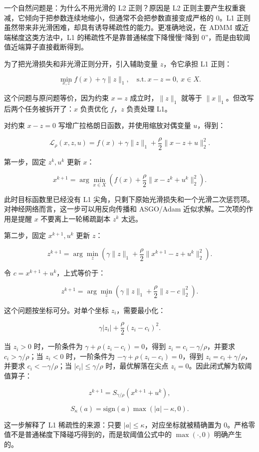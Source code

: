 \documentclass[UTF8,a4paper,12pt,fontset=none]{ctexart}
\begin{document}
一个自然问题是：为什么不用光滑的 L2 正则？原因是 L2 正则主要产生权重衰减，它倾向于把参数连续地缩小，但通常不会把参数直接变成严格的 0。L1 正则虽然带来非光滑困难，却具有诱导稀疏性的能力。更准确地说，在 ADMM 或近端梯度这类方法中，L1 的稀疏性不是靠普通梯度下降慢慢“降到 0”，而是由软阈值近端算子直接截断得到。

为了把光滑损失和非光滑正则分开，引入辅助变量 $z$，令它承担 L1 正则：

\[
\min_{x,z} f(x)+\gamma\|z\|_1,\quad \mathrm{s.t.}\ x-z=0,\ x\in X.
\]

这个问题与原问题等价，因为约束 $x=z$ 成立时，$\|z\|_1$ 就等于 $\|x\|_1$。但改写后两个任务被拆开了：$x$ 负责优化 $f$，$z$ 负责处理 L1。

对约束 $x-z=0$ 写增广拉格朗日函数，并使用缩放对偶变量 $u$，得到：

\[
\mathcal L_\rho(x,z,u)=f(x)+\gamma\|z\|_1+\frac{\rho}{2}\|x-z+u\|_2^2.
\]

第一步，固定 $z^k,u^k$ 更新 $x$：

\[
x^{k+1}=\arg\min_{x\in X}\left(f(x)+\frac{\rho}{2}\|x-z^k+u^k\|_2^2\right).
\]

此时目标函数里已经没有 L1 尖角，只剩下原始光滑损失和一个光滑二次惩罚项。对神经网络而言，这一步可以用反向传播和 ASGO/Adam 近似求解。二次项的作用是提醒 $x$ 不要离上一轮稀疏副本 $z^k$ 太远。

第二步，固定 $x^{k+1},u^k$ 更新 $z$：

\[
z^{k+1}=\arg\min_z\left(\gamma\|z\|_1+\frac{\rho}{2}\|x^{k+1}-z+u^k\|_2^2\right).
\]

令 $c=x^{k+1}+u^k$，上式等价于：

\[
z^{k+1}=\arg\min_z\left(\gamma\|z\|_1+\frac{\rho}{2}\|z-c\|_2^2\right).
\]

这个问题按坐标可分。对单个坐标 $z_i$，需要最小化：

\[
\gamma |z_i|+\frac{\rho}{2}(z_i-c_i)^2.
\]

当 $z_i>0$ 时，一阶条件为 $\gamma+\rho(z_i-c_i)=0$，得到 $z_i=c_i-\gamma/\rho$，并要求 $c_i>\gamma/\rho$；当 $z_i<0$ 时，一阶条件为 $-\gamma+\rho(z_i-c_i)=0$，得到 $z_i=c_i+\gamma/\rho$，并要求 $c_i<-\gamma/\rho$；当 $|c_i|\le \gamma/\rho$ 时，最优解落在尖点 $z_i=0$。因此闭式解为软阈值算子：

\[
z^{k+1}=S_{\gamma/\rho}(x^{k+1}+u^k),
\]

\[
S_\kappa(a)=\mathrm{sign}(a)\max(|a|-\kappa,0).
\]

这一步解释了 L1 稀疏性的来源：只要 $|a|\le \kappa$，对应坐标就被精确置为 0。严格零值不是普通梯度下降碰巧得到的，而是软阈值公式中的 $\max(\cdot,0)$ 明确产生的。
\end{document}
